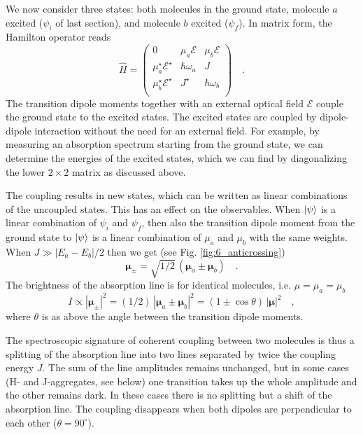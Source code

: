 We now consider three states: both molecules in the ground state, molecule $a$ excited ($\psi_i$ of last section), and molecule $b$ excited ($\psi_f$). In matrix form, the Hamilton operator reads 
\begin{equation}
\hat{H} = \begin{pmatrix}
0 & \mu_a \mathcal{E}& \mu_b \mathcal{E} \\
\mu_a^\star \mathcal{E}^\star & \hbar \omega_a & J  \\
\mu_b^\star \mathcal{E}^\star & J^\star & \hbar \omega_b \\
\end{pmatrix} \quad .
\end{equation}
The transition dipole moments together with an external optical field $\mathcal{E}$ couple the ground state to the excited states. The excited states are coupled by dipole-dipole interaction without the need for an external field. For example, by measuring an absorption spectrum starting from the ground state, we can determine the energies of the excited states, which we can find by diagonalizing the lower $2 \times 2$ matrix as discussed above.

The coupling results in new states, which can be written as linear combinations of the uncoupled states. This has an effect on the observables. When $\ket{\psi}$ is a linear combination of $\psi_i$ and $\psi_f$, then also the transition dipole moment from  the ground state to $\ket{\psi}$ is a linear combination of $\mu_a$ and $\mu_b$ with the same weights. When $J \gg |E_a - E_b| / 2$ then we get (see Fig. \ref{fig:6_anticrossing})
\begin{equation}
 \boldsymbol{\mu}_{\pm} = \sqrt{1/2} \, \left( \boldsymbol{\mu}_a \pm \boldsymbol{\mu}_b \right) \quad .
\end{equation}
The brightness of the absorption line is for identical molecules, i.e. $\mu = \mu_a = \mu_b$
\begin{equation}
 I \propto |\boldsymbol{\mu}_{\pm}|^2 = (1/2) \, \left| \boldsymbol{\mu}_a \pm \boldsymbol{\mu}_b \right|^2 = \left( 1 \pm \cos \theta \right) \, \left| \boldsymbol{\mu}   \right| ^2 \quad ,
\end{equation}
where $\theta$ is as above the angle between the transition dipole moments.  

The spectroscopic signature of coherent coupling between two molecules is thus a splitting of the absorption line into two lines separated by twice the coupling energy $J$. The sum of the line amplitudes remains unchanged, but in some cases (H- and J-aggregates, see below) one transition takes up the whole amplitude and the other remains dark. In these cases there is no splitting but a shift of the absorption line. The coupling disappears when both dipoles are perpendicular to each other ($\theta = 90^\circ$).


